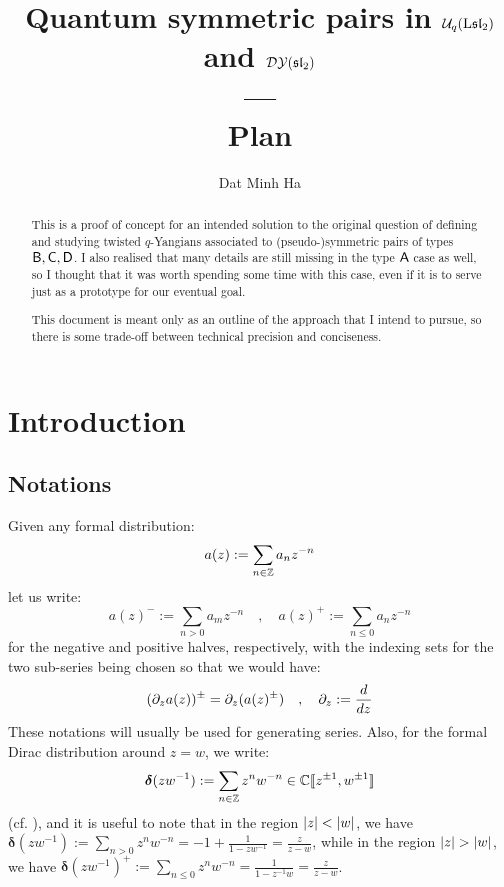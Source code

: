 

\setcounter{section}{0}


\renewcommand{\1}{\boldsymbol{\delta}}



    \title{
        Quantum symmetric pairs in $\mathcal{U}_q(\mathrm{L}\mathfrak{sl}_2)$ and $\mathcal{DY}(\mathfrak{sl}_2)$
        \\
        ---
        \\
        Plan
    }
    
    \author{Dat Minh Ha}
    \maketitle

    \begin{abstract}
        This is a proof of concept for an intended solution to the original question of defining and studying twisted $q$-Yangians associated to (pseudo-)symmetric pairs of types $\mathsf{B}, \mathsf{C}, \mathsf{D}$. I also realised that many details are still missing in the type $\mathsf{A}$ case as well, so I thought that it was worth spending some time with this case, even if it is to serve just as a prototype for our eventual goal.
        
        This document is meant only as an outline of the approach that I intend to pursue, so there is some trade-off between technical precision and conciseness. 
    \end{abstract}
    
    {
    \hypersetup{} 
    \tableofcontents %
    }

    \section{Introduction}
        \subsection{Notations}
            Given any formal distribution:
                $$a(z) := \sum_{n \in \mathbb{Z}} a_n z^{-n}$$
            let us write:
                $$a(z)^- := \sum_{n > 0} a_m z^{-n} \quad, \quad a(z)^+ := \sum_{n \leq 0} a_n z^{-n}$$
            for the negative and positive halves, respectively, with the indexing sets for the two sub-series being chosen so that we would have:
                $$(\partial_z a(z))^{\pm} = \partial_z( a(z)^{\pm} ) \quad, \quad \partial_z := \frac{d}{dz}$$
            These notations will usually be used for generating series. Also, for the formal Dirac distribution around $z = w$, we write:
                $$\1(zw^{-1}) := \sum_{n \in \Z} z^n w^{-n} \in \bbC[\![z^{\pm 1}, w^{\pm 1}]\!]$$
            (cf. \cite[p. 65]{jimbo_miwa_algebraic_analysis_of_solvable_lattice_models}), and it is useful to note that in the region $\left\lvert {z} \right\rvert < \left\lvert {w} \right\rvert$, we have $\1(zw^{-1}) := \sum_{n > 0} z^n w^{-n} = -1 + \frac{1}{1 - zw^{-1}} = \frac{z}{z - w}$, while in the region $\left\lvert {z} \right\rvert > \left\lvert {w} \right\rvert$, we have $\1(zw^{-1})^+ := \sum_{n \leq 0} z^n w^{-n} = \frac{1}{1 - z^{-1}w} = \frac{z}{z - w}$.

